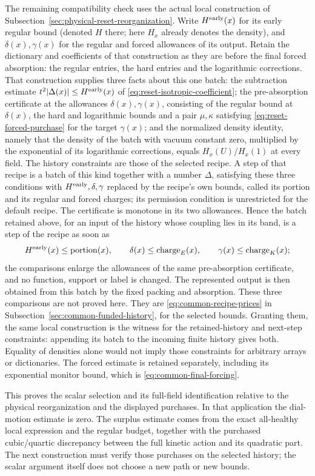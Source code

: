 The remaining compatibility check uses the actual local construction
of Subsection~\ref{sec:physical-reset-reorganization}. Write
$H^{\rm early}(x)$ for its early regular bound (denoted $H$ there;
here $H_x$ already denotes the density), and $\delta(x),\gamma(x)$
for the regular and forced allowances of its output. Retain the dictionary and coefficients of that construction as they
are before the final forced absorption: the regular entries, the
hard entries and the logarithmic corrections. That construction
supplies three facts about this one batch: the subtraction
estimate $t^2|\Delta(x)|\le H^{\rm early}(x)$ of
\eqref{eq:reset-isotropic-coefficient}; the pre-absorption
certificate at the allowances $\delta(x),\gamma(x)$, consisting of
the regular bound at $\delta(x)$, the hard and logarithmic bounds
and a pair $\mu,\kappa$ satisfying
\eqref{eq:reset-forced-purchase} for the target $\gamma(x)$; and
the normalized density identity, namely that the density of the
batch with vacuum constant zero, multiplied by the exponential of
its logarithmic corrections, equals $H_x(U)/H_x(1)$ at every field.
The history constraints are those of the selected recipe. A step of
that recipe is a batch of this kind together with a number
$\Delta$, satisfying these three conditions with
$H^{\rm early},\delta,\gamma$ replaced by the recipe's own bounds,
called its portion and its regular and forced charges; its
permission condition is unrestricted for the default recipe. The
certificate is monotone in its two allowances. Hence the batch
retained above, for an input of the history whose coupling lies
in its band, is a step of the recipe as soon as
\[
 H^{\rm early}(x)\le\operatorname{portion}(x),\qquad
 \delta(x)\le\operatorname{charge}_E(x),\qquad
 \gamma(x)\le\operatorname{charge}_K(x);
\]
the comparisons enlarge the allowances of the same pre-absorption
certificate, and no function, support or label is changed. The
represented output is then obtained from this batch by the fixed
packing and absorption. These three comparisons are
not proved here. They are \eqref{eq:common-recipe-prices} in
Subsection~\ref{sec:common-funded-history}, for the selected bounds.
Granting them, the same local construction is the witness for the
retained-history and next-step constraints: appending its batch to
the incoming finite history gives both. Equality
of densities alone would not imply those constraints for arbitrary
arrays or dictionaries. The forced estimate is retained separately,
including its exponential monitor bound, which is
\eqref{eq:common-final-forcing}.

This proves the scalar selection and its full-field identification
relative to the physical reorganization and the displayed purchases.
In that application the dial-motion estimate is zero. The surplus
estimate comes from the exact all-healthy local expression and the
regular budget, together with the purchased cubic/quartic discrepancy
between the full kinetic action and its quadratic part. The next
construction must verify those purchases on the selected history;
the scalar argument itself does not choose a new path or new bounds.
